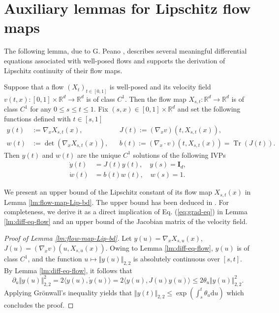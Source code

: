 \documentclass[twoside,11pt]{article}
\def\rmI{{\mathbf{I}}}
\def\sR{{\mathbb{R}}}
\DeclareMathOperator{\Tr}{Tr}
\def\paref#1{(\ref{#1})}
\newcommand{\diff}{\mathrm{d}}
\numberwithin{equation}{section}
\begin{document}
\section{Auxiliary lemmas for Lipschitz flow maps}
The following lemma, due to G. Peano \cite[Theorem 3.1]{hartman2002dependence}, describes several meaningful differential equations associated with well-posed flows and supports the derivation of Lipschitz continuity of their flow maps.

\begin{lemma} \label{lm:diff-eq-flow} \cite[Lemma 3.4]{ambrosio2023classical}
Suppose that a flow $(X_t)_{t \in [0, 1]}$ is well-posed and its velocity field $v(t, x): [0, 1] \times \sR^d \to \sR^d$ is of class $C^1$. Then the flow map $X_{s,t}: \sR^d \to \sR^d$ is of class $C^1$ for any $0 \le s \le t \le 1$. Fix $(s, x) \in [0, 1] \times \sR^d$ and set the following functions defined with $t \in [s, 1]$
\begin{align*}
    y(t) &:= \nabla_x X_{s,t}(x),        && J(t) := (\nabla_x v) (t, X_{s,t}(x)), \\
    w(t) &:= \det (\nabla_x X_{s,t}(x)), && b(t) := (\nabla_x \cdot v) (t, X_{s,t}(x)) = \Tr(J(t)).
\end{align*}
Then $y(t)$ and $w(t)$ are the unique $C^1$ solutions of the following IVPs
\begin{align}
    \label{eq:grad-eq}
    \dot{y}(t) &= J(t)y(t), \quad y(s) = \rmI_d, \\
    \label{eq:det-eq}
    \dot{w}(t) &= b(t) w(t), \quad w(s) = 1.
\end{align}
\end{lemma}

{\color{black} We present an upper bound of the Lipschitz constant of its flow map $X_{s, t}(x)$ in Lemma \ref{lm:flow-map-Lip-bd}.}
The upper bound has been deduced in \citet{mikulincer2023lipschitz, ambrosio2023classical, dai2023lipschitz}. For completeness, we derive it as a direct implication of Eq. \paref{eq:grad-eq} in
{\color{black} Lemma \ref{lm:diff-eq-flow} }
and an upper bound of the Jacobian matrix of the velocity field.

\begin{proof}[Proof of Lemma \ref{lm:flow-map-Lip-bd}]
Let $y(u) = \nabla_x X_{s,u}(x)$, $J(u) = (\nabla_x v) (u, X_{s,u}(x))$.
Owing to Lemma \ref{lm:diff-eq-flow}, $y(u)$ is of class $C^1$, and the function $u \mapsto \Vert y(u) \Vert_{2,2}$ is absolutely continuous over $[s, t]$. By Lemma \ref{lm:diff-eq-flow}, it follows that
\begin{equation*}
    \partial_u \Vert y(u) \Vert_{2,2}^2 = 2 \langle y(u), \dot{y}(u) \rangle
    = 2 \langle y(u), J(u) y(u) \rangle \le 2 \theta_u \Vert y(u) \Vert_{2,2}^2.
\end{equation*}
Applying Gr{\"o}nwall's inequality yields that $\Vert y(t) \Vert_{2,2} \le \exp( \int_s^t \theta_u \diff u)$ which concludes the proof.
\end{proof}
\end{document}
